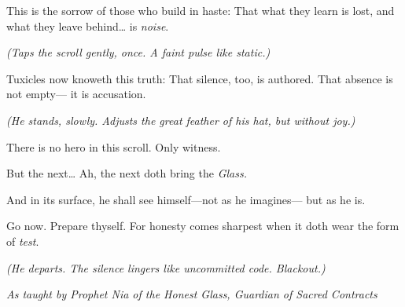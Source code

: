 This is the sorrow of those who build in haste: That what they learn is lost, and what they leave behind\ldots{} is \emph{noise}.

\emph{(Taps the scroll gently, once. A faint pulse like static.)}

Tuxicles now knoweth this truth: That silence, too, is authored. That absence is not empty--- it is accusation.

\emph{(He stands, slowly. Adjusts the great feather of his hat, but without joy.)}

There is no hero in this scroll. Only witness.

But the next\ldots{} Ah, the next doth bring the \emph{Glass.}

And in its surface, he shall see himself---not as he imagines--- but as he is.

Go now. Prepare thyself. For honesty comes sharpest when it doth wear the form of \emph{test}.

\emph{(He departs. The silence lingers like uncommitted code. Blackout.)}

\bookdivider

\emph{As taught by Prophet Nia of the Honest Glass, Guardian of Sacred Contracts}

\bookdivider

